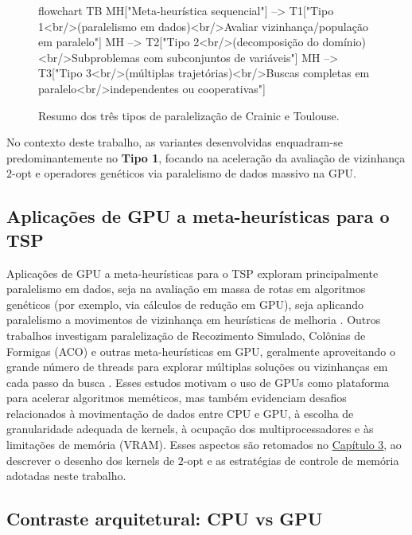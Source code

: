 \begin{figure}[htbp]
  \centering
  \begin{mermaid}
    flowchart TB
    MH["Meta-heurística sequencial"] --> T1["Tipo 1<br/>(paralelismo em dados)<br/>Avaliar vizinhança/população em paralelo"]
    MH --> T2["Tipo 2<br/>(decomposição do domínio)<br/>Subproblemas com subconjuntos de variáveis"]
    MH --> T3["Tipo 3<br/>(múltiplas trajetórias)<br/>Buscas completas em paralelo<br/>independentes ou cooperativas"]
  \end{mermaid}
  \caption{Resumo dos três tipos de paralelização de Crainic e Toulouse.}
  \label{fig:crainic-taxonomy}
\end{figure}

No contexto deste trabalho, as variantes desenvolvidas enquadram-se
predominantemente no \textbf{Tipo 1}, focando na aceleração da avaliação
de vizinhança \(2\)-opt e operadores genéticos via paralelismo de dados
massivo na GPU.

\subsection{Aplicações de GPU a meta-heurísticas para o TSP}\label{sec-262-gpu-aplicacoes-tsp}

Aplicações de GPU a meta-heurísticas para o TSP exploram principalmente
paralelismo em dados, seja na avaliação em massa de rotas em algoritmos
genéticos (por exemplo, via cálculos de redução em GPU), seja aplicando
paralelismo a movimentos de vizinhança em heurísticas de melhoria
\autocite{schulz2013gpu,tsp_gpu,fujimoto2011highly}. Outros trabalhos
investigam paralelização de Recozimento Simulado, Colônias de Formigas
(ACO) e outras meta-heurísticas em GPU, geralmente aproveitando o grande
número de threads para explorar múltiplas soluções ou vizinhanças em
cada passo da busca
\autocite{binjubier2024gpu,rey2018cpu,abdelatti2020improvedgpuheuristic}.
Esses estudos motivam o uso de GPUs como plataforma para acelerar
algoritmos meméticos, mas também evidenciam desafios relacionados à
movimentação de dados entre CPU e GPU, à escolha de granularidade
adequada de kernels, à ocupação dos multiprocessadores e às limitações
de memória (VRAM). Esses aspectos são retomados no
\hyperref[cap3-materiais-metodos]{Capítulo 3}, ao descrever o desenho
dos kernels de \(2\)-opt e as estratégias de controle de memória
adotadas neste trabalho.

\subsection{Contraste arquitetural: CPU vs GPU}\label{sec-263-cpu-vs-gpu}

